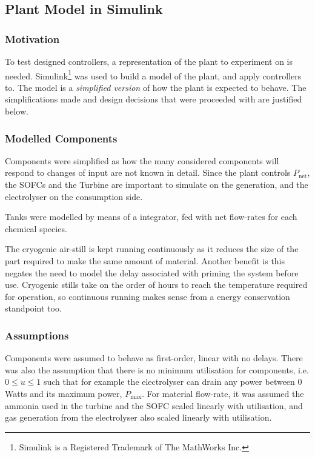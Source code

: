 \subsection{Plant Model in Simulink\textregistered}
\label{sec:plant}

\subsubsection{Motivation}
To test designed controllers, a representation of the plant to experiment on is needed.
Simulink\footnote{Simulink is a Registered Trademark of The MathWorks Inc.} was used to build a model of the plant, and apply controllers to.
The model is a \emph{simplified version} of how the plant is expected to behave.
The simplifications made and design decisions that were proceeded with are justified below.

\subsubsection{Modelled Components}

Components were simplified as how the many considered components will respond to changes of input are not known in detail.
Since the plant controls $P_{\text{net}}$, the SOFCs and the Turbine are important to simulate on the generation, and the electrolyser on the consumption side.

Tanks were modelled by means of a integrator, fed with net flow-rates for each chemical species.

The cryogenic air-still is kept running continuously as it reduces the size of the part required to make the same amount of material.
Another benefit is this negates the need to model the delay associated with priming the system before use.
Cryogenic stills take on the order of hours to reach the temperature required for operation, so continuous running makes sense from a energy conservation standpoint too.

\subsubsection{Assumptions}

Components were assumed to behave as first-order, linear with no delays.
There was also the assumption that there is no minimum utilisation for components, i.e. $0 \leq u \leq 1$ such that for example the electrolyser can drain any power between $0$ Watts and its maximum power, $P_{\text{max}}$.
For material flow-rate, it was assumed the ammonia used in the turbine and the SOFC scaled linearly with utilisation, and gas generation from the electrolyser also scaled linearly with utilisation.

